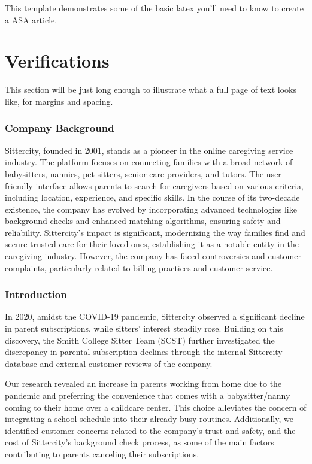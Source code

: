 \documentclass[12pt]{article}
\begin{document}
This template demonstrates some of the basic latex you'll need to know
to create a ASA article.

\section{Verifications}
\label{sec:verify}

This section will be just long enough to illustrate what a full page of
text looks like, for margins and spacing.

\hypertarget{company-background}{%
\subsubsection{\texorpdfstring{\textbf{Company
Background}}{Company Background}}\label{company-background}}

Sittercity, founded in 2001, stands as a pioneer in the online
caregiving service industry. The platform focuses on connecting families
with a broad network of babysitters, nannies, pet sitters, senior care
providers, and tutors. The user-friendly interface allows parents to
search for caregivers based on various criteria, including location,
experience, and specific skills. In the course of its two-decade
existence, the company has evolved by incorporating advanced
technologies like background checks and enhanced matching algorithms,
ensuring safety and reliability. Sittercity's impact is significant,
modernizing the way families find and secure trusted care for their
loved ones, establishing it as a notable entity in the caregiving
industry. However, the company has faced controversies and customer
complaints, particularly related to billing practices and customer
service.

\hypertarget{introduction-1}{%
\subsubsection{\texorpdfstring{\textbf{Introduction}}{Introduction}}\label{introduction-1}}

In 2020, amidst the COVID-19 pandemic, Sittercity observed a significant
decline in parent subscriptions, while sitters' interest steadily rose.
Building on this discovery, the Smith College Sitter Team (SCST) further
investigated the discrepancy in parental subscription declines through
the internal Sittercity database and external customer reviews of the
company.

Our research revealed an increase in parents working from home due to
the pandemic and preferring the convenience that comes with a
babysitter/nanny coming to their home over a childcare center. This
choice alleviates the concern of integrating a school schedule into
their already busy routines. Additionally, we identified customer
concerns related to the company's trust and safety, and the cost of
Sittercity's background check process, as some of the main factors
contributing to parents canceling their subscriptions.
\end{document}
